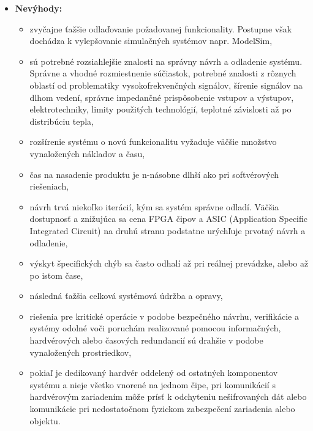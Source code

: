 \documentclass[12pt,a4paper,oneside,openright]{report}
\begin{document}
\begin{itemize}
\begin{itemize}

		\end{itemize}
		\item \textbf{Nevýhody:}
		\begin{itemize}
			\item zvyčajne ťažšie odlaďovanie požadovanej funkcionality. Postupne však dochádza k vylepšovanie simulačných systémov napr. ModelSim,
			\item sú potrebné rozsiahlejšie znalosti na správny návrh a odladenie systému. Správne a vhodné rozmiestnenie súčiastok, potrebné znalosti z rôznych oblastí od problematiky vysokofrekvenčných signálov, šírenie signálov na dlhom vedení, správne impedančné prispôsobenie vstupov a výstupov, elektrotechniky, limity použitých technológií, teplotné závislosti až po distribúciu tepla,
			\item rozšírenie systému o novú funkcionalitu vyžaduje väčšie množstvo vynaložených nákladov a času,
			\item čas na nasadenie produktu je n-násobne dlhší ako pri softvérových riešeniach,
			\item návrh trvá niekoľko iterácií, kým sa systém správne odladí. Väčšia dostupnosť a znižujúca sa cena FPGA čipov a ASIC (Application Specific Integrated Circuit) na druhú stranu podstatne urýchľuje prvotný návrh a odladenie,
			\item výskyt špecifických chýb sa často odhalí až pri reálnej prevádzke, alebo až po istom čase,
			\item následná ťažšia celková systémová údržba a opravy,
			\item riešenia pre kritické operácie v podobe bezpečného návrhu, verifikácie a systémy odolné voči poruchám realizované pomocou informačných, hardvérových alebo časových redundancií sú drahšie v podobe vynaložených prostriedkov,
			\item pokiaľ je dedikovaný hardvér oddelený od ostatných komponentov systému a nieje všetko vnorené na jednom čipe, pri komunikácií s hardvérovým zariadením môže prísť k odchyteniu nešifrovaných dát alebo komunikácie pri nedostatočnom fyzickom zabezpečení zariadenia alebo objektu.
			
		\end{itemize}
	\end{itemize}
\end{document}
